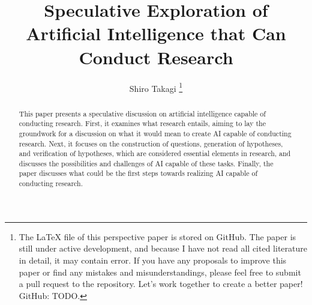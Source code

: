\documentclass{article}
\title{Speculative Exploration of Artificial Intelligence that Can Conduct Research}
\author{Shiro Takagi \footnote{The LaTeX file of this perspective paper is stored on GitHub. The paper is still under active development, and because I have not read all cited literature in detail, it may contain error. If you have any proposals to improve this paper or find any mistakes and misunderstandings, please feel free to submit a pull request to the repository. Let's work together to create a better paper! \\ GitHub: TODO. }}
\begin{document}
\sloppy
\maketitle
\tableofcontents

\begin{abstract}
This paper presents a speculative discussion on artificial intelligence capable of conducting research. First, it examines what research entails, aiming to lay the groundwork for a discussion on what it would mean to create AI capable of conducting research. Next, it focuses on the construction of questions, generation of hypotheses, and verification of hypotheses, which are considered essential elements in research, and discusses the possibilities and challenges of AI capable of these tasks. Finally, the paper discusses what could be the first steps towards realizing AI capable of conducting research.
\end{abstract}




% 
% 
% 



% 


\appendix

\end{document}

